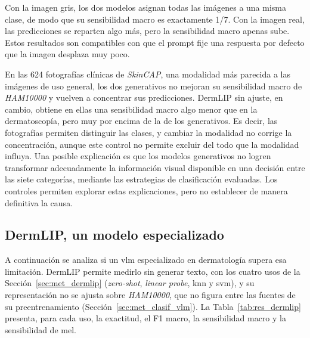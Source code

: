 Con la imagen gris, los dos modelos asignan todas las imágenes a una misma clase, de modo que su sensibilidad macro es
exactamente 1/7. Con la imagen real, las predicciones se reparten algo más, pero la sensibilidad macro apenas sube.
Estos resultados son compatibles con que el prompt fije una respuesta por defecto que la imagen desplaza muy poco.

En las 624 fotografías clínicas de \emph{SkinCAP}, una modalidad más parecida a las imágenes de uso general, los dos
generativos no mejoran su sensibilidad macro de \emph{HAM10000} y vuelven a concentrar sus predicciones. DermLIP sin ajuste, en cambio, obtiene
en ellas una sensibilidad macro algo menor que en la dermatoscopía, pero muy por encima de la de los generativos. Es
decir, las fotografías permiten distinguir las clases, y cambiar la modalidad no corrige la concentración, aunque este
control no permite excluir del todo que la modalidad influya. Una posible explicación es que los modelos generativos no logren transformar adecuadamente la información visual disponible en una decisión entre las siete categorías, mediante las estrategias de clasificación evaluadas. Los controles permiten explorar estas explicaciones, pero no establecer de manera definitiva la causa.

\subsection{DermLIP, un modelo especializado}
\label{sec:res_vlm_dermlip}

A continuación se analiza si un \gls{vlm} especializado en dermatología supera esa limitación. DermLIP permite medirlo sin
generar texto, con los cuatro usos de la Sección~\ref{sec:met_dermlip} (\emph{zero-shot}, \emph{linear probe}, \gls{knn} y
\gls{svm}), y su representación no se ajusta sobre \emph{HAM10000}, que no figura entre las fuentes de su
preentrenamiento (Sección~\ref{sec:met_clasif_vlm}). La Tabla~\ref{tab:res_dermlip} presenta, para
cada uso, la exactitud, el F1 macro, la sensibilidad macro y la sensibilidad de \gls{mel}.

